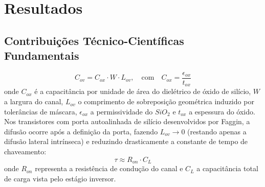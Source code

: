 
\section{Resultados}
\label{sec:resultados}


\subsection{Contribuições Técnico-Científicas Fundamentais}
\label{subsec:contribuicoes_tecnicas}


\begin{equation}
\label{eq:cov}
C_{ov} = C_{ox} \cdot W \cdot L_{ov}, \quad \text{com} \quad C_{ox} = \frac{\epsilon_{ox}}{t_{ox}}
\end{equation}
onde $C_{ox}$ é a capacitância por unidade de área do dielétrico de óxido de silício, $W$ a largura do canal, $L_{ov}$ o comprimento de sobreposição geométrica induzido por tolerâncias de máscara, $\epsilon_{ox}$ a permissividade do $SiO_2$ e $t_{ox}$ a espessura do óxido. Nos transistores com porta autoalinhada de silício desenvolvidos por Faggin, a difusão ocorre após a definição da porta, fazendo $L_{ov} \to 0$ (restando apenas a difusão lateral intrínseca) e reduzindo drasticamente a constante de tempo de chaveamento:
\begin{equation}
\label{eq:tau}
\tau \approx R_{on} \cdot C_L
\end{equation}
onde $R_{on}$ representa a resistência de condução do canal e $C_L$ a capacitância total de carga vista pelo estágio inversor.

